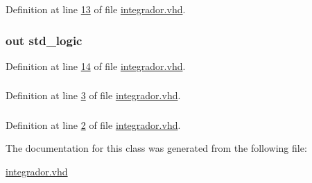 Definition at line \hyperlink{integrador_8vhd_source_l00013}{13} of file \hyperlink{integrador_8vhd_source}{integrador.\+vhd}.

\hypertarget{classintegrador_aae281cf725515894f893258c629a59c7}{}
\subsubsection[{sinc}]{ {\bfseries \textcolor{keywordflow}{out}\textcolor{vhdlchar}{ }} {\bfseries \textcolor{comment}{std\+\_\+logic}\textcolor{vhdlchar}{ }} \hspace{0.3cm}{\ttfamily [Port]}}\label{classintegrador_aae281cf725515894f893258c629a59c7}


Definition at line \hyperlink{integrador_8vhd_source_l00014}{14} of file \hyperlink{integrador_8vhd_source}{integrador.\+vhd}.

\hypertarget{classintegrador_aa4b2b25246a821511120e3149b003563}{}
\subsubsection[{S\+T\+D\+\_\+\+L\+O\+G\+I\+C\+\_\+1164}]{\hspace{0.3cm}{\ttfamily [Package]}}\label{classintegrador_aa4b2b25246a821511120e3149b003563}


Definition at line \hyperlink{integrador_8vhd_source_l00003}{3} of file \hyperlink{integrador_8vhd_source}{integrador.\+vhd}.

\hypertarget{classintegrador_a241c3e72dd8024cc8ae831b1b2aed7db}{}
\subsubsection[{S\+T\+D\+\_\+\+L\+O\+G\+I\+C\+\_\+\+U\+N\+S\+I\+G\+N\+E\+D}]{\hspace{0.3cm}{\ttfamily [Package]}}\label{classintegrador_a241c3e72dd8024cc8ae831b1b2aed7db}


Definition at line \hyperlink{integrador_8vhd_source_l00002}{2} of file \hyperlink{integrador_8vhd_source}{integrador.\+vhd}.



The documentation for this class was generated from the following file\+:\begin{DoxyCompactItemize}
\item 
\hyperlink{integrador_8vhd}{integrador.\+vhd}\end{DoxyCompactItemize}
